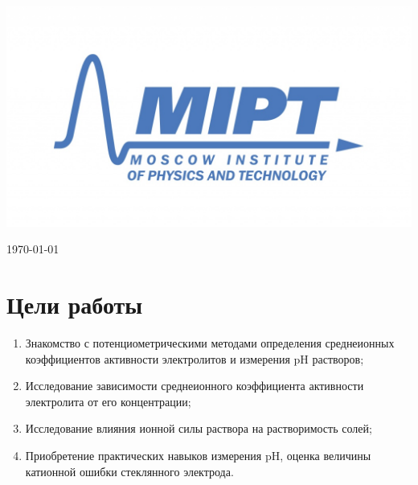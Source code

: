 \documentclass[a4paper, 12pt]{article}
\newenvironment{bottompar}{\par\vspace*{\fill}}{\clearpage}
\begin{document}
\begin{titlepage}
\begin{bottompar}
	\begin{center}
		\includegraphics[width = 80 mm]{logo.jpg}
	\end{center}
	{\large \today}

\end{bottompar}
\vfill %

\end{titlepage}

\newpage
\section{Цели работы}
	\begin{enumerate}
	
		\item 
		Знакомство с потенциометрическими методами определения среднеионных коэффициентов активности электролитов и измерения pH растворов;   
		\item 
		Исследование зависимости среднеионного коэффициента активности электролита от его концентрации;   
		\item 
		Исследование влияния ионной силы раствора на растворимость солей;
		\item
		Приобретение практических навыков измерения pH, оценка величины катионной ошибки стеклянного электрода.   
	\end{enumerate}
	
\end{document}
